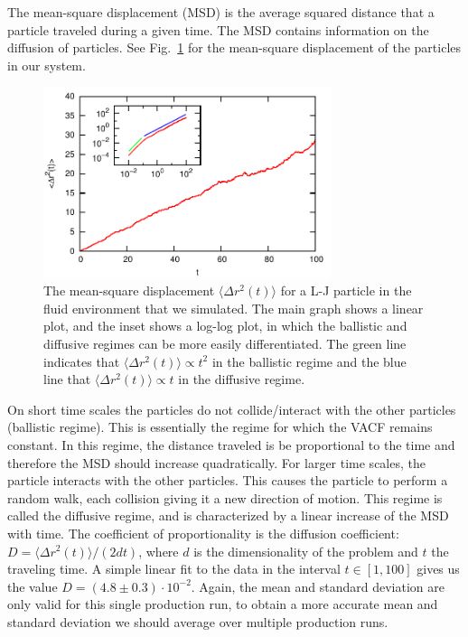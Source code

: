 \documentclass[
paper=a4,                       %
fontsize=11pt,                  %
twoside,                        %
footsepline,                    %
headsepline,                    %
headinclude=false,              %
footinclude=false,              %
pagesize,                       %
]{scrartcl}
\begin{document}
The mean-square displacement (MSD) is the average squared distance that a particle traveled during a given time. The MSD contains information on the diffusion of particles. See Fig.~\ref{fig:msd} for the mean-square displacement of the particles in our system. 

\begin{figure}[!ht]
\begin{center}
\includegraphics[width=0.75\textwidth]{figures/msd}
\caption{\label{fig:msd} The mean-square displacement $\langle \Delta r^{2}(t)  \rangle$ for a L-J particle in the fluid environment that we simulated. The main graph shows a linear plot, and the inset shows a log-log plot, in which the ballistic and diffusive regimes can be more easily differentiated. The green line indicates that $\langle \Delta r^{2}(t)  \rangle \propto t^2$ in the ballistic regime and the blue line that $\langle \Delta r^{2}(t) \rangle \propto t$ in the diffusive regime.}
\end{center}
\end{figure}

On short time scales the particles do not collide/interact with the other particles (ballistic regime). This is essentially the regime for which the VACF remains constant. In this regime, the distance traveled is be proportional to the time and therefore the MSD should increase quadratically. For larger time scales, the particle interacts with the other particles. This causes the particle to perform a random walk, each collision giving it a new direction of motion. This regime is called the diffusive regime, and is characterized by a linear increase of the MSD with time. The coefficient of proportionality is the diffusion coefficient: $D = \langle \Delta r^2(t) \rangle/(2 d t)$, where $d$ is the dimensionality of the problem and $t$ the traveling time. A simple linear fit to the data in the interval $t \in [1,100]$ gives us the value $D = (4.8 \pm 0.3) \cdot 10^{-2}$. Again, the mean and standard deviation are only valid for this single production run, to obtain a more accurate mean and standard deviation we should average over multiple production runs.
\end{document}
